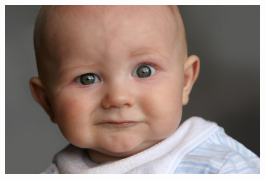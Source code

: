 \documentclass{beamer}
\begin{document}
\begin{frame}
	\includegraphics[width=\textwidth,height=0.8\textheight,keepaspectratio]
					{perplexed.jpg}
\end{frame}
\end{document}
